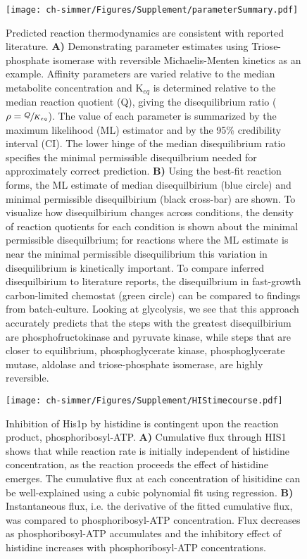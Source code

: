 \begin{figure}[H]
\texttt{[image: ch-simmer/Figures/Supplement/parameterSummary.pdf]}
\caption[Predicted reaction thermodynamics are consistent with reported literature]{Predicted reaction thermodynamics are consistent with reported literature. \textbf{A)} Demonstrating parameter estimates using Triose-phosphate isomerase with reversible Michaelis-Menten kinetics as an example.  Affinity parameters are varied relative to the median metabolite concentration and K$_{eq}$ is determined relative to the median reaction quotient (Q), giving the disequilibrium ratio ($\rho = \sfrac{Q}{K_{eq}}$).  The value of each parameter is summarized by the maximum likelihood (ML) estimator and by the 95\% credibility interval (CI).  The lower hinge of the median disequilibrium ratio specifies the minimal permissible disequilbrium needed for approximately correct prediction.  \textbf{B)} Using the best-fit reaction forms, the ML estimate of median disequilbirium (blue circle) and minimal permissible disequilbirium (black cross-bar) are shown.  To visualize how disequilbirium changes across conditions, the density of reaction quotients for each condition is shown about the minimal permissible disequilbrium; for reactions where the ML estimate is near the minimal permissible disequilibrium this variation in disequilibrium is kinetically important.  To compare inferred disequilbirium to literature reports, the disequilbrium in fast-growth carbon-limited chemostat (green circle) can be compared to findings from batch-culture.  Looking at glycolysis, we see that this approach accurately predicts that the steps with the greatest disequilbirium are phosphofructokinase and pyruvate kinase, while steps that are closer to equilibrium, phosphoglycerate kinase, phosphoglycerate mutase, aldolase and triose-phosphate isomerase, are highly reversible.}
\label{fig:paramaterValues}
\end{figure}

\begin{figure}[H]
\texttt{[image: ch-simmer/Figures/Supplement/HIStimecourse.pdf]}
\caption[Inhibition of His1p by histidine is contingent upon the reaction product, phosphoribosyl-ATP]{Inhibition of His1p by histidine is contingent upon the reaction product, phosphoribosyl-ATP.   \textbf{A)} Cumulative flux through HIS1 shows that while reaction rate is initially independent of histidine concentration, as the reaction proceeds the effect of histidine emerges. The cumulative flux at each concentration of hisitidine can be well-explained using a cubic polynomial fit using regression. \textbf{B)} Instantaneous flux, i.e. the derivative of the fitted cumulative flux, was compared to phosphoribosyl-ATP concentration.  Flux decreases as phosphoribosyl-ATP accumulates and the inhibitory effect of histidine increases with phosphoribosyl-ATP concentrations.}
\label{fig:atpprtase}
\end{figure}


